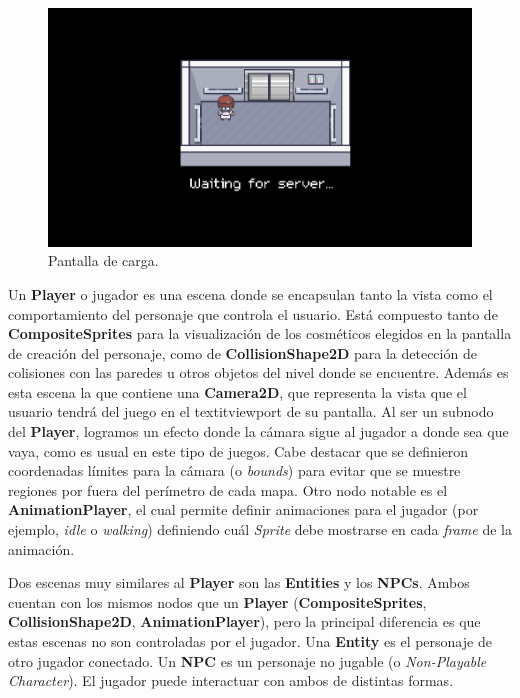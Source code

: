 \begin{figure}[htbp]
    \centering
    \includegraphics[width=1.0\textwidth]{../assets/godot-loading-screen.png}
    \caption{Pantalla de carga.}
    \label{fig:loading-screen}
\end{figure}

Un \textbf{Player} o jugador es una escena donde se encapsulan tanto la vista como el comportamiento del
personaje que controla el usuario. Está compuesto tanto de \textbf{CompositeSprites} para la visualización
de los cosméticos elegidos en la pantalla de creación del personaje, como de \textbf{CollisionShape2D} para
la detección de colisiones con las paredes u otros objetos del nivel donde se encuentre.
Además es esta escena la que contiene una \textbf{Camera2D}, que representa la vista que el usuario tendrá
del juego en el textit{viewport} de su pantalla. Al ser un subnodo del \textbf{Player}, logramos un efecto donde la
cámara sigue al jugador a donde sea que vaya, como es usual en este tipo de juegos. Cabe destacar que se 
definieron coordenadas límites para la cámara (o \textit{bounds}) para evitar que se muestre regiones por
fuera del perímetro de cada mapa.
Otro nodo notable es el \textbf{AnimationPlayer}, el cual permite definir animaciones para el jugador
(por ejemplo, \textit{idle} o \textit{walking}) definiendo cuál \textit{Sprite} debe mostrarse en cada
\textit{frame} de la animación.

Dos escenas muy similares al \textbf{Player} son las \textbf{Entities} y los \textbf{NPCs}.
Ambos cuentan con los mismos nodos que un \textbf{Player} (\textbf{CompositeSprites}, \textbf{CollisionShape2D},
\textbf{AnimationPlayer}), pero la principal diferencia es que estas escenas no son controladas por el jugador.
Una \textbf{Entity} es el personaje de otro jugador conectado. Un \textbf{NPC} es un personaje no jugable
(o \textit{Non-Playable Character}). El jugador puede interactuar con ambos de distintas formas.

